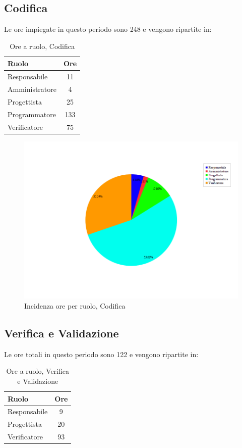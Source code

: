 \subsection{Codifica}
Le ore impiegate in questo periodo sono 248 e vengono ripartite in:
\begin{table}[H]
	\begin{center}
		\begin{tabular}{|l|c|}
			\hline
			\textbf{Ruolo}	& \textbf{Ore} \\
			\hline
			Responsabile	&	11	\\
			\hline
			Amministratore	&	4	\\
			\hline
			Progettista		&	25	\\
			\hline
			Programmatore	&	133	\\
			\hline
			Verificatore	&	75	\\
			\hline
		\end{tabular}
	\end{center}
	\caption{Ore a ruolo, Codifica}
\end{table}

\begin{figure}[H]
	\centering
	\includegraphics[scale=0.3]{immagini/Grafi/OreRuoloCod}
	\caption{Incidenza ore per ruolo, Codifica}
\end{figure}

\subsection{Verifica e Validazione}
Le ore totali in questo periodo sono 122 e vengono ripartite in:
\begin{table}[H]
	\begin{center}
		\begin{tabular}{|l|c|}
			\hline
			\textbf{Ruolo}	& \textbf{Ore} \\
			\hline
			Responsabile	&	9	\\
			\hline
			Progettista		&	20	\\
			\hline
			Verificatore	&	93	\\
			\hline
		\end{tabular}
	\end{center}
	\caption{Ore a ruolo, Verifica e Validazione}
\end{table}

